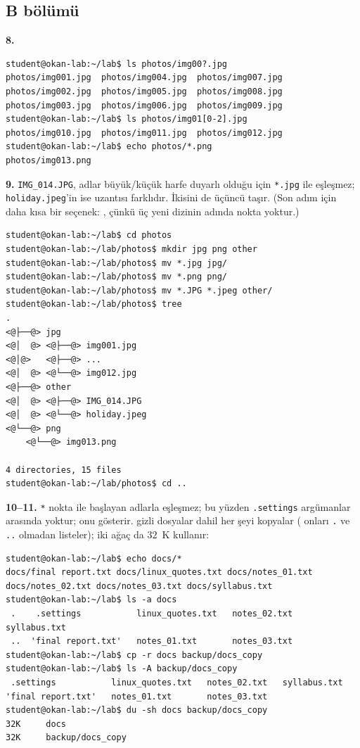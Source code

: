 \subsection*{B bölümü}

\textbf{8.}
\begin{lstlisting}[style=term,basicstyle=\ttfamily\scriptsize\color{light}]
student@okan-lab:~/lab$ ls photos/img00?.jpg
photos/img001.jpg  photos/img004.jpg  photos/img007.jpg
photos/img002.jpg  photos/img005.jpg  photos/img008.jpg
photos/img003.jpg  photos/img006.jpg  photos/img009.jpg
student@okan-lab:~/lab$ ls photos/img01[0-2].jpg
photos/img010.jpg  photos/img011.jpg  photos/img012.jpg
student@okan-lab:~/lab$ echo photos/*.png
photos/img013.png
\end{lstlisting}

\textbf{9.} \texttt{IMG\_014.JPG}, adlar büyük/küçük harfe duyarlı olduğu için \texttt{*.jpg} ile eşleşmez; \texttt{holiday.jpeg}'in ise uzantısı farklıdır. İkisini de üçüncü  taşır. (Son adım için daha kısa bir seçenek: , çünkü üç yeni dizinin adında nokta yoktur.)
\begin{lstlisting}[style=term,basicstyle=\ttfamily\scriptsize\color{light}]
student@okan-lab:~/lab$ cd photos
student@okan-lab:~/lab/photos$ mkdir jpg png other
student@okan-lab:~/lab/photos$ mv *.jpg jpg/
student@okan-lab:~/lab/photos$ mv *.png png/
student@okan-lab:~/lab/photos$ mv *.JPG *.jpeg other/
student@okan-lab:~/lab/photos$ tree
.
<@├──@> jpg
<@│  @> <@├──@> img001.jpg
<@│@>   <@├──@> ...
<@│  @> <@└──@> img012.jpg
<@├──@> other
<@│  @> <@├──@> IMG_014.JPG
<@│  @> <@└──@> holiday.jpeg
<@└──@> png
    <@└──@> img013.png

4 directories, 15 files
student@okan-lab:~/lab/photos$ cd ..
\end{lstlisting}

\textbf{10--11.} \texttt{*} nokta ile başlayan adlarla eşleşmez; bu yüzden \texttt{.settings} argümanlar arasında yoktur;  onu gösterir.  gizli dosyalar dahil her şeyi kopyalar ( onları \texttt{.} ve \texttt{..} olmadan listeler); iki ağaç da $32$~K kullanır:
\begin{lstlisting}[style=term,basicstyle=\ttfamily\scriptsize\color{light}]
student@okan-lab:~/lab$ echo docs/*
docs/final report.txt docs/linux_quotes.txt docs/notes_01.txt docs/notes_02.txt docs/notes_03.txt docs/syllabus.txt
student@okan-lab:~/lab$ ls -a docs
 .    .settings           linux_quotes.txt   notes_02.txt   syllabus.txt
 ..  'final report.txt'   notes_01.txt       notes_03.txt
student@okan-lab:~/lab$ cp -r docs backup/docs_copy
student@okan-lab:~/lab$ ls -A backup/docs_copy
 .settings           linux_quotes.txt   notes_02.txt   syllabus.txt
'final report.txt'   notes_01.txt       notes_03.txt
student@okan-lab:~/lab$ du -sh docs backup/docs_copy
32K     docs
32K     backup/docs_copy
\end{lstlisting}

